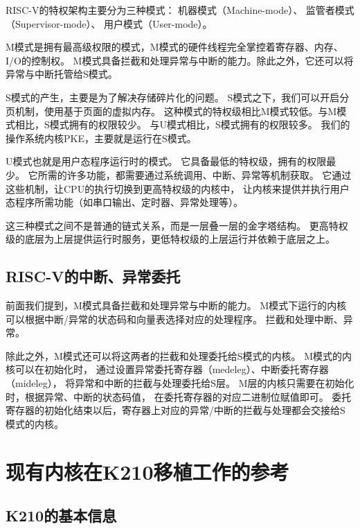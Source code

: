 RISC-V的特权架构主要分为三种模式：
机器模式（Machine-mode）、
监管者模式（Supervisor-mode）、
用户模式（User-mode）。

M模式是拥有最高级权限的模式，M模式的硬件线程完全掌控着寄存器、内存、I/O的控制权。
M模式具备拦截和处理异常与中断的能力。除此之外，它还可以将异常与中断托管给S模式。

S模式的产生，主要是为了解决存储碎片化的问题。
S模式之下，我们可以开启分页机制，使用基于页面的虚拟内存。
这种模式的特权级相比M模式较低。与M模式相比，S模式拥有的权限较少。
与U模式相比，S模式拥有的权限较多。
我们的操作系统内核PKE，主要就是运行在S模式。

U模式也就是用户态程序运行时的模式。
它具备最低的特权级，拥有的权限最少。
它所需的许多功能，都需要通过系统调用、中断、异常等机制获取。
它通过这些机制，让CPU的执行切换到更高特权级的内核中，
让内核来提供并执行用户态程序所需功能（如串口输出、定时器、异常处理等）。

这三种模式之间不是普通的链式关系，而是一层叠一层的金字塔结构。
更高特权级的底层为上层提供运行时服务，更低特权级的上层运行并依赖于底层之上。

\subsection{RISC-V的中断、异常委托}

前面我们提到，M模式具备拦截和处理异常与中断的能力。
M模式下运行的内核可以根据中断/异常的状态码和向量表选择对应的处理程序。
拦截和处理中断、异常。

除此之外，M模式还可以将这两者的拦截和处理委托给S模式的内核。
M模式的内核可以在初始化时，
通过设置异常委托寄存器（medeleg）、中断委托寄存器（mideleg），
将异常和中断的拦截与处理委托给S层。
M层的内核只需要在初始化时，根据异常、中断的状态码值，
在委托寄存器的对应二进制位赋值即可。
委托寄存器的初始化结束以后，寄存器上对应的异常/中断的拦截与处理都会交接给S模式的内核。

\section{现有内核在K210移植工作的参考}

\subsection{K210的基本信息}

